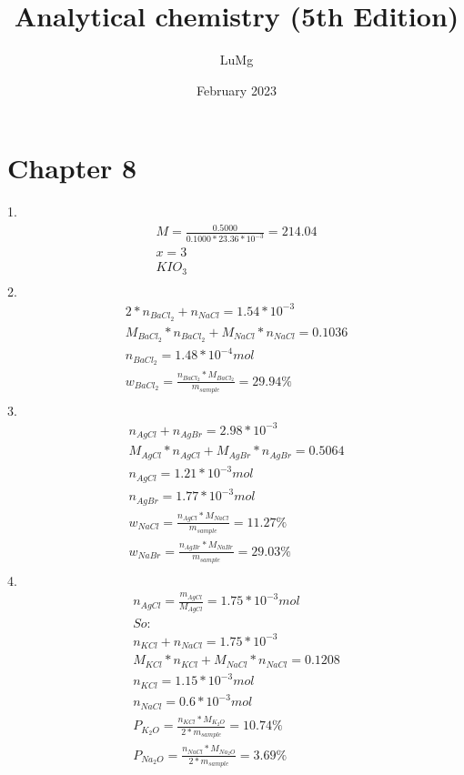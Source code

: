 \documentclass{article}
\title{Analytical chemistry (5th Edition)}
\author{LuMg}
\date{February 2023}
\begin{document}
\maketitle

\section{Chapter 8}
1.\begin{equation}
    \begin{multlined}
        M = \frac{0.5000}{0.1000*23.36*10^{-3}} = 214.04\\
        x = 3\\
        KIO_3\\
    \end{multlined}
\end{equation}
2.\begin{equation}
    \begin{multlined}
        2*n_{BaCl_2} + n_{NaCl} = 1.54*10^{-3}\\
        M_{BaCl_2}*n_{BaCl_2} + M_{NaCl}*n_{NaCl} = 0.1036\\
        n_{BaCl_2} = 1.48*10^{-4} mol\\
        w_{BaCl_2} = \frac{n_{BaCl_2}*M_{BaCl_2}}{m_{sample}} = 29.94\%\\
    \end{multlined}
\end{equation}
3.\begin{equation}
    \begin{multlined}
        n_{AgCl}+n_{AgBr} = 2.98*10^{-3}\\
        M_{AgCl}*n_{AgCl}+M_{AgBr}*n_{AgBr} = 0.5064\\
        n_{AgCl} = 1.21*10^{-3} mol\\
        n_{AgBr} = 1.77*10^{-3} mol\\
        w_{NaCl} = \frac{n_{AgCl}*M_{NaCl}}{m_{sample}} = 11.27\%\\
        w_{NaBr} = \frac{n_{AgBr}*M_{NaBr}}{m_{sample}} = 29.03\%\\
    \end{multlined}
\end{equation}
4.\begin{equation}
    \begin{multlined}
        n_{AgCl} = \frac{m_{AgCl}}{M_{AgCl}} = 1.75*10^{-3} mol\\
        So:\\
        n_{KCl}+n_{NaCl} = 1.75*10^{-3}\\
        M_{KCl}*n_{KCl} + M_{NaCl}*n_{NaCl} = 0.1208\\
        n_{KCl} = 1.15*10^{-3} mol\\
        n_{NaCl} = 0.6*10^{-3} mol\\
        P_{K_2O} = \frac{n_{KCl}*M_{K_2O}}{2*m_{sample}} = 10.74\%\\
        P_{Na_2O} = \frac{n_{NaCl}*M_{Na_2O}}{2*m_{sample}} = 3.69\%\\
    \end{multlined}
\end{equation}
\end{document}
